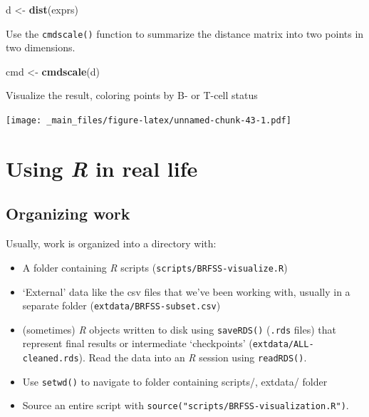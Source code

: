 \documentclass[]{article}
\newenvironment{Shaded}{\begin{snugshade}}{\end{snugshade}}
\newcommand{\KeywordTok}[1]{\textcolor[rgb]{0.13,0.29,0.53}{\textbf{#1}}}
\newcommand{\DataTypeTok}[1]{\textcolor[rgb]{0.13,0.29,0.53}{#1}}
\newcommand{\StringTok}[1]{\textcolor[rgb]{0.31,0.60,0.02}{#1}}
\newcommand{\OperatorTok}[1]{\textcolor[rgb]{0.81,0.36,0.00}{\textbf{#1}}}
\newcommand{\NormalTok}[1]{#1}
\providecommand{\tightlist}{%
  \setlength{\itemsep}{0pt}\setlength{\parskip}{0pt}}
\theoremstyle{definition}
\theoremstyle{definition}
\theoremstyle{remark}
\begin{document}
\begin{Shaded}
\begin{Highlighting}[]
\NormalTok{d <-}\StringTok{ }\KeywordTok{dist}\NormalTok{(exprs)}
\end{Highlighting}
\end{Shaded}

Use the \texttt{cmdscale()} function to summarize the distance matrix
into two points in two dimensions.

\begin{Shaded}
\begin{Highlighting}[]
\NormalTok{cmd <-}\StringTok{ }\KeywordTok{cmdscale}\NormalTok{(d)}
\end{Highlighting}
\end{Shaded}

Visualize the result, coloring points by B- or T-cell status

\begin{Shaded}
\end{Shaded}

\texttt{[image: \_main\_files/figure-latex/unnamed-chunk-43-1.pdf]}

\section{\texorpdfstring{Using \emph{R} in real
life}{Using R in real life}}\label{using-r-in-real-life}

\subsection{Organizing work}\label{organizing-work}

Usually, work is organized into a directory with:

\begin{itemize}
\tightlist
\item
  A folder containing \emph{R} scripts
  (\texttt{scripts/BRFSS-visualize.R})
\item
  `External' data like the csv files that we've been working with,
  usually in a separate folder (\texttt{extdata/BRFSS-subset.csv})
\item
  (sometimes) \emph{R} objects written to disk using \texttt{saveRDS()}
  (\texttt{.rds} files) that represent final results or intermediate
  `checkpoints' (\texttt{extdata/ALL-cleaned.rds}). Read the data into
  an \emph{R} session using \texttt{readRDS()}.
\item
  Use \texttt{setwd()} to navigate to folder containing scripts/,
  extdata/ folder
\item
  Source an entire script with
  \texttt{source("scripts/BRFSS-visualization.R")}.
\end{itemize}
\end{document}
